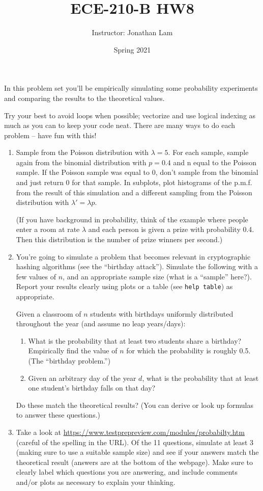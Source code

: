 \documentclass{article}
\title{ECE-210-B HW8}
\author{Instructor: Jonathan Lam}
\date{Spring 2021}
\begin{document}
	\maketitle
	
	\noindent In this problem set you'll be empirically simulating some probability experiments and comparing the results to the theoretical values.
	
	Try your best to avoid loops when possible; vectorize and use logical indexing as much as you can to keep your code neat. There are many ways to do each problem -- have fun with this!
	
	\begin{enumerate}
		\item Sample from the Poisson distribution with $\lambda=5$. For each sample, sample
		again from the binomial distribution with $p=0.4$ and n equal to the Poisson
		sample. If the Poisson sample was equal to 0, don’t sample from the binomial
		and just return 0 for that sample. In subplots, plot histograms of the p.m.f.
		from the result of this simulation and a different sampling from the Poisson
		distribution with $\lambda'=\lambda p$.
		
		(If you have background in probability, think of the
		example where people enter a room at rate $\lambda$ and each person is given a prize
		with probability 0.4. Then this distribution is the number of prize
		winners per second.)
		
		\item You're going to simulate a problem that becomes relevant in cryptographic hashing algorithms (see the ``birthday attack''). Simulate the following with a few values of $n$, and an appropriate sample size (what is a ``sample'' here?). Report your results clearly using plots or a table (see \lstinline|help table|) as appropriate.
		
		Given a classroom of $n$ students with birthdays uniformly distributed throughout the year (and assume no leap years/days):
		
		\begin{enumerate}
			\item What is the probability that at least two students share a birthday? Empirically find the value of $n$ for which the probability is roughly 0.5. (The ``birthday problem.'')
			
			\item Given an arbitrary day of the year $d$, what is the probability that at least one student's birthday falls on that day?
		\end{enumerate}
	
		Do these match the theoretical results? (You can derive or look up formulas to answer these questions.)
		
		\clearpage
		\item Take a look at \url{https://www.testprepreview.com/modules/probabilty.htm} (careful of the spelling in the URL). Of the 11 questions, simulate at least 3 (making sure to use a suitable sample size) and see if your answers match the theoretical result (answers are at the bottom of the webpage). Make sure to clearly label which questions you are answering, and include comments and/or plots as necessary to explain your thinking.
	\end{enumerate}
\end{document}
